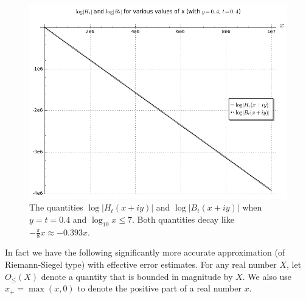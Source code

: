 \documentclass[a4paper,11pt,twoside]{amsart}
\begin{document}
\begin{figure}[ht!]
  \includegraphics[width=0.8\linewidth]{loghtbt.png}
  \caption{The quantities $\log|H_t(x+iy)|$ and $\log|B_t(x+iy)|$ when $y=t=0.4$ and $\log_{10} x \leq 7$.   Both quantities decay like $- \frac{\pi}{8} x \approx -0.393 x$.}
\label{loghtandlogbt}
\end{figure}

In fact we have the following significantly more accurate approximation (of Riemann-Siegel type) with effective error estimates.
For any real number $X$, let $O_{\leq}(X)$ denote a quantity that is bounded in magnitude by $X$. We also use $x_+ = \max(x,0)$ to denote the positive part of a real number $x$.
\end{document}

